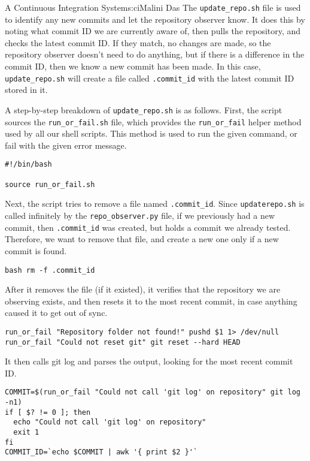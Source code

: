 \begin{aosachapter}{A Continuous Integration System}{s:ci}{Malini Das}
The \texttt{update\_repo.sh} file is used to identify any new commits
and let the repository observer know. It does this by noting what commit
ID we are currently aware of, then pulls the repository, and checks the
latest commit ID. If they match, no changes are made, so the repository
observer doesn't need to do anything, but if there is a difference in
the commit ID, then we know a new commit has been made. In this case,
\texttt{update\_repo.sh} will create a file called \texttt{.commit\_id}
with the latest commit ID stored in it.

A step-by-step breakdown of \texttt{update\_repo.sh} is as follows.
First, the script sources the \texttt{run\_or\_fail.sh} file, which
provides the \texttt{run\_or\_fail} helper method used by all our shell
scripts. This method is used to run the given command, or fail with the
given error message.

\begin{verbatim}
#!/bin/bash

source run_or_fail.sh 
\end{verbatim}

Next, the script tries to remove a file named \texttt{.commit\_id}.
Since \texttt{updaterepo.sh} is called infinitely by the
\texttt{repo\_observer.py} file, if we previously had a new commit, then
\texttt{.commit\_id} was created, but holds a commit we already tested.
Therefore, we want to remove that file, and create a new one only if a
new commit is found.

\begin{verbatim}
bash rm -f .commit_id 
\end{verbatim}

After it removes the file (if it existed), it verifies that the
repository we are observing exists, and then resets it to the most
recent commit, in case anything caused it to get out of sync.

\begin{verbatim}
run_or_fail "Repository folder not found!" pushd $1 1> /dev/null
run_or_fail "Could not reset git" git reset --hard HEAD
\end{verbatim}

It then calls git log and parses the output, looking for the most recent
commit ID.

\begin{verbatim}
COMMIT=$(run_or_fail "Could not call 'git log' on repository" git log -n1)
if [ $? != 0 ]; then
  echo "Could not call 'git log' on repository"
  exit 1
fi
COMMIT_ID=`echo $COMMIT | awk '{ print $2 }'`
\end{verbatim}


\end{aosachapter}
